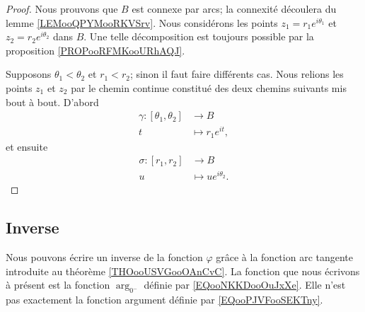 \begin{proof}
	Nous prouvons que \( B\) est connexe par arcs; la connexité découlera du lemme \ref{LEMooQPYMooRKVSrv}. Nous considérons les points \( z_1=r_1e^{i\theta_1}\) et \( z_2=r_2e^{i\theta_2}\) dans \( B\). Une telle décomposition est toujours possible par la proposition \ref{PROPooRFMKooURhAQJ}.

	Supposons \( \theta_1<\theta_2\) et \( r_1<r_2\); sinon il faut faire différents cas. Nous relions les points \( z_1\) et \( z_2\) par le chemin continue constitué des deux chemins suivants mis bout à bout. D'abord
	\begin{equation}
		\begin{aligned}
			\gamma\colon [\theta_1 ,\theta_2] & \to B              \\
			t                                 & \mapsto r_1e^{it},
		\end{aligned}
	\end{equation}
	et ensuite
	\begin{equation}
		\begin{aligned}
			\sigma\colon [r_1 ,r_2] & \to B                      \\
			u                       & \mapsto    ue^{i\theta_2}.
		\end{aligned}
	\end{equation}
\end{proof}

\subsection{Inverse}
\label{SUBSECooWFNMooOuZBRN}

Nous pouvons écrire un inverse de la fonction \( \varphi\) grâce à la fonction arc tangente introduite au théorème \ref{THOooUSVGooOAnCvC}.
La fonction que nous écrivons à présent est la fonction \( \arg_{0^{-}} \) définie par \eqref{EQooNKKDooOuJxXe}. Elle n'est pas exactement la fonction argument définie par \eqref{EQooPJVFooSEKTny}.

